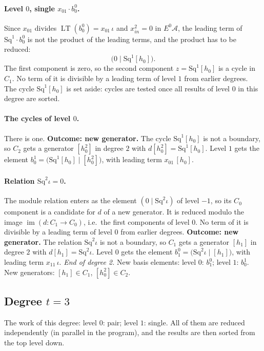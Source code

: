 \documentclass[11pt]{article}
\newcommand{\Sq}{\mathrm{Sq}}
\DeclareMathOperator{\LT}{LT}
\begin{document}
\paragraph{Level $0$, single $x_{01}\cdot b^{0}_{0}$.} Since $x_{01}$ divides $\LT(b^{0}_{0}) = x_{01}\,\iota$ and $x_{in}^2 = 0$ in $E^0\mathcal A$, the leading term of $\Sq^{1}\cdot b^{0}_{0}$ is not the product of the leading terms, and the product has to be reduced:
\[\bigl(0 \;\big|\; \Sq^{1}[h_0]\bigr).\]
The first component is zero, so the second component $z = \Sq^{1}[h_0]$ is a cycle in $C_{1}$.
No term of it is divisible by a leading term of level $1$ from earlier degrees.
The cycle $\Sq^{1}[h_0]$ is set aside: cycles are tested once all results of level $0$ in this degree are sorted.
\medskip
\paragraph{The cycles of level $0$.} There is one.
\textbf{Outcome: new generator.} The cycle $\Sq^{1}[h_0]$ is not a boundary, so $C_{2}$ gets a generator $[h_0^2]$ in degree $2$ with $d[h_0^2] = \Sq^{1}[h_0]$.
Level $1$ gets the element $b^{1}_{0} = \bigl(\Sq^{1}[h_0] \;\big|\; [h_0^2]\bigr)$, with leading term $x_{01}\,[h_0]$.
\medskip
\paragraph{Relation $\Sq^{2}\iota = 0$.} The module relation enters as the element $(0 \mid \Sq^{2}\iota)$ of level $-1$, so its $C_0$ component is a candidate for $d$ of a new generator. It is reduced modulo the image $\operatorname{im}(d\colon C_1\to C_0)$, i.e.\ the first components of level $0$.
No term of it is divisible by a leading term of level $0$ from earlier degrees.
\textbf{Outcome: new generator.} The relation $\Sq^{2}\iota$ is not a boundary, so $C_{1}$ gets a generator $[h_1]$ in degree $2$ with $d[h_1] = \Sq^{2}\iota$.
Level $0$ gets the element $b^{0}_{1} = \bigl(\Sq^{2}\iota \;\big|\; [h_1]\bigr)$, with leading term $x_{11}\,\iota$.
\medskip\noindent\emph{End of degree 2.} New basis elements: level $0$: $b^{0}_{1}$; level $1$: $b^{1}_{0}$. New generators: $[h_1]\in C_{1}$, $[h_0^2]\in C_{2}$.
\subsection*{Degree $t = 3$}
\noindent The work of this degree: level $0$: pair; level $1$: single. All of them are reduced independently (in parallel in the program), and the results are then sorted from the top level down.
\medskip
\end{document}
